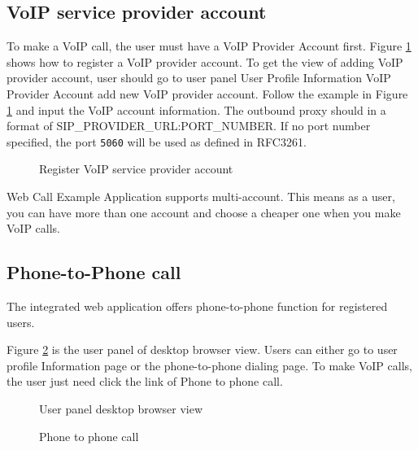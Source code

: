 \subsection{VoIP service provider account}

To make a VoIP call, the user must have a VoIP Provider Account first. Figure \ref{fig:RegisterVoIPAccount} shows how to register a VoIP provider account. To get the view of adding VoIP provider account, user should go to user panel \textrightarrow{} User Profile Information \textrightarrow{} VoIP Provider Account \textrightarrow{} add new VoIP provider account.
Follow the example in Figure \ref{fig:RegisterVoIPAccount} and input the VoIP account information. The outbound proxy should in a format of SIP\_PROVIDER\_URL:PORT\_NUMBER. If no port number specified, the port \texttt{5060} will be used as defined in RFC3261\cite{RFC3261}.

\begin{figure}[!hbtp]
\centering
{}
\caption{Register VoIP service provider account}
\label{fig:RegisterVoIPAccount}
\end{figure} 

Web Call Example Application supports multi-account. This means as a user, you can have more than one account and choose a cheaper one when you make VoIP calls.

\subsection{Phone-to-Phone call}

The integrated web application offers phone-to-phone function for registered users. 

Figure \ref{fig:UserPanelDesktopBrowserView} is the user panel of desktop browser view. Users can either go to user profile Information page or the phone-to-phone dialing page. To make VoIP calls, the user just need click the link of Phone to phone call.

\begin{figure}[!hbtp]
\centering
{}
\caption{User panel desktop browser view}
\label{fig:UserPanelDesktopBrowserView}
\end{figure} 

\begin{figure}[!hbtp]
\centering
{}
\caption{Phone to phone call}
\label{fig:PhoneToPhoneCall}
\end{figure} 

